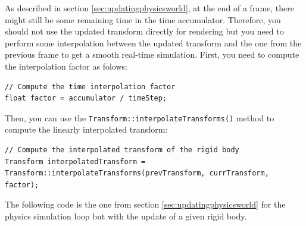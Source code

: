 \documentclass[a4paper,12pt]{article}
\begin{document}
    As described in section \ref{sec:updatingphysicsworld}, at the end of a frame, there might still be some remaining time in the time accumulator.
    Therefore, you should not use the updated transform directly for rendering but you need to perform some interpolation between the updated transform
    and the one from the previous frame to get a smooth real-time simulation.  First, you need to compute the interpolation factor as folows: \\

    \begin{lstlisting}
// Compute the time interpolation factor
float factor = accumulator / timeStep;
    \end{lstlisting}

    \vspace{0.6cm}

    Then, you can use the \texttt{Transform::interpolateTransforms()} method to compute the linearly interpolated transform:  \\

    \begin{lstlisting}
// Compute the interpolated transform of the rigid body
Transform interpolatedTransform = Transform::interpolateTransforms(prevTransform, currTransform, factor);
  \end{lstlisting}

    \vspace{0.6cm}

    The following code is the one from section \ref{sec:updatingphysicsworld} for the physics simulation loop but with the update of a given rigid body. \\
    
\end{document}

